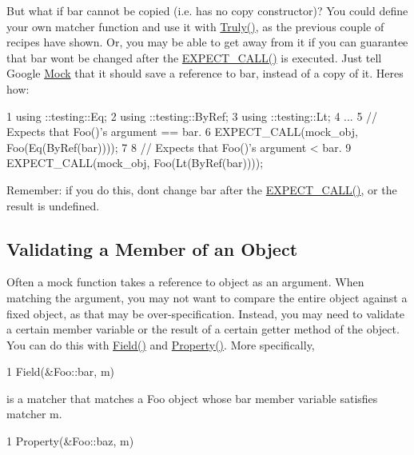 But what if {\ttfamily bar} cannot be copied (i.\+e. has no copy constructor)? You could define your own matcher function and use it with {\ttfamily \hyperlink{namespacetesting_a5faf05cfaae6074439960048e478b1c8}{Truly()}}, as the previous couple of recipes have shown. Or, you may be able to get away from it if you can guarantee that {\ttfamily bar} won\textquotesingle{}t be changed after the {\ttfamily \hyperlink{gmock-spec-builders_8h_a535a6156de72c1a2e25a127e38ee5232}{E\+X\+P\+E\+C\+T\+\_\+\+C\+A\+L\+L()}} is executed. Just tell Google \hyperlink{class_mock}{Mock} that it should save a reference to {\ttfamily bar}, instead of a copy of it. Here\textquotesingle{}s how\+:


\begin{DoxyCode}
1 using ::testing::Eq;
2 using ::testing::ByRef;
3 using ::testing::Lt;
4 ...
5   // Expects that Foo()'s argument == bar.
6   EXPECT\_CALL(mock\_obj, Foo(Eq(ByRef(bar))));
7 
8   // Expects that Foo()'s argument < bar.
9   EXPECT\_CALL(mock\_obj, Foo(Lt(ByRef(bar))));
\end{DoxyCode}


Remember\+: if you do this, don\textquotesingle{}t change {\ttfamily bar} after the {\ttfamily \hyperlink{gmock-spec-builders_8h_a535a6156de72c1a2e25a127e38ee5232}{E\+X\+P\+E\+C\+T\+\_\+\+C\+A\+L\+L()}}, or the result is undefined.

\subsection*{Validating a Member of an Object}

Often a mock function takes a reference to object as an argument. When matching the argument, you may not want to compare the entire object against a fixed object, as that may be over-\/specification. Instead, you may need to validate a certain member variable or the result of a certain getter method of the object. You can do this with {\ttfamily \hyperlink{namespacetesting_a4df3849391696aa93ac3a7703a717c2a}{Field()}} and {\ttfamily \hyperlink{namespacetesting_a0fad10571e23f7bc0d5c83d4c31ba740}{Property()}}. More specifically,


\begin{DoxyCode}
1 Field(&Foo::bar, m)
\end{DoxyCode}


is a matcher that matches a {\ttfamily Foo} object whose {\ttfamily bar} member variable satisfies matcher {\ttfamily m}.


\begin{DoxyCode}
1 Property(&Foo::baz, m)
\end{DoxyCode}


